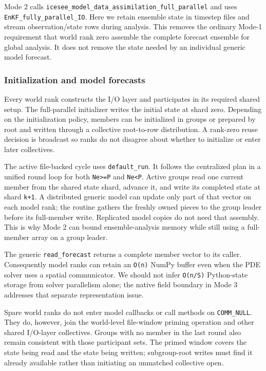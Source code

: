 \documentclass[11pt,a4paper]{article}
\newcommand{\code}[1]{\nolinkurl{#1}}
\begin{document}
Mode 2 calls \code{icesee_model_data_assimilation_full_parallel} and uses \code{EnKF_fully_parallel_IO}. Here we retain ensemble state in timestep files and stream observation/state rows during analysis. This removes the ordinary Mode-1 requirement that world rank zero assemble the complete forecast ensemble for global analysis. It does not remove the state needed by an individual generic model forecast.

\subsubsection{Initialization and model forecasts}

Every world rank constructs the I/O layer and participates in its required shared setup. The full-parallel initializer writes the initial state at shard zero. Depending on the initialization policy, members can be initialized in groups or prepared by root and written through a collective root-to-row distribution. A rank-zero reuse decision is broadcast so ranks do not disagree about whether to initialize or enter later collectives.

The active file-backed cycle uses \code{default_run}. It follows the centralized plan in a unified round loop for both \code{Ne>=P} and \code{Ne<P}. Active groups read one current member from the shared state shard, advance it, and write its completed state at shard \code{k+1}. A distributed generic model can update only part of that vector on each model rank; the routine gathers the freshly owned pieces to the group leader before its full-member write. Replicated model copies do not need that assembly. This is why Mode 2 can bound ensemble-analysis memory while still using a full-member array on a group leader.

The generic \code{read_forecast} returns a complete member vector to its caller. Consequently model ranks can retain an \code{O(n)} NumPy buffer even when the PDE solver uses a spatial communicator. We should not infer \code{O(n/S)} Python-state storage from solver parallelism alone; the native field boundary in Mode 3 addresses that separate representation issue.

Spare world ranks do not enter model callbacks or call methods on \code{COMM_NULL}. They do, however, join the world-level file-window priming operation and other shared I/O-layer collectives. Groups with no member in the last round also remain consistent with those participant sets. The primed window covers the state being read and the state being written; subgroup-root writes must find it already available rather than initiating an unmatched collective open.
\end{document}
